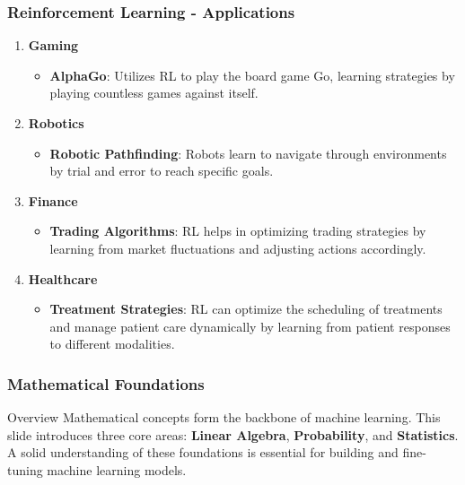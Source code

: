 \documentclass[aspectratio=169]{beamer}
\begin{document}
\begin{frame}[fragile]
    \frametitle{Reinforcement Learning - Applications}
    \begin{enumerate}
        \item \textbf{Gaming}
            \begin{itemize}
                \item \textbf{AlphaGo}: Utilizes RL to play the board game Go, learning strategies by playing countless games against itself.
            \end{itemize}
        \item \textbf{Robotics}
            \begin{itemize}
                \item \textbf{Robotic Pathfinding}: Robots learn to navigate through environments by trial and error to reach specific goals.
            \end{itemize}
        \item \textbf{Finance}
            \begin{itemize}
                \item \textbf{Trading Algorithms}: RL helps in optimizing trading strategies by learning from market fluctuations and adjusting actions accordingly.
            \end{itemize}
        \item \textbf{Healthcare}
            \begin{itemize}
                \item \textbf{Treatment Strategies}: RL can optimize the scheduling of treatments and manage patient care dynamically by learning from patient responses to different modalities.
            \end{itemize}
    \end{enumerate}
\end{frame}

\begin{frame}[fragile]
    \frametitle{Mathematical Foundations}
    \begin{block}{Overview}
        Mathematical concepts form the backbone of machine learning. This slide introduces three core areas: 
        \textbf{Linear Algebra}, \textbf{Probability}, and \textbf{Statistics}. A solid understanding of these foundations is essential for building and fine-tuning machine learning models.
    \end{block}
\end{frame}
\end{document}
